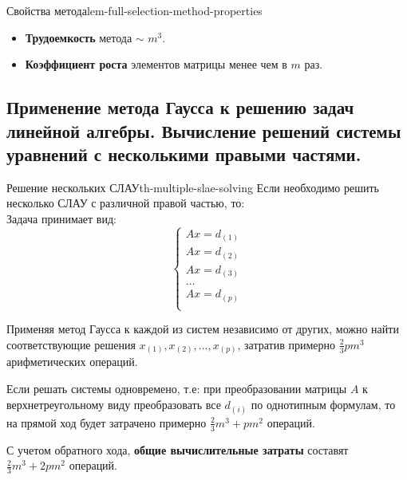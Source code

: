 \documentclass[14pt]{extarticle}
\begin{document}
        \begin{lemma}{Свойства метода}{lem-full-selection-method-properties}
            \begin{itemize}
                \item \textbf{Трудоемкость} метода $\sim$ $m^{3}$.
                \item \textbf{Коэффициент роста} элементов матрицы менее чем в $m$ раз.
            \end{itemize}
        \end{lemma}

\clearpage
\subsection{Применение метода Гаусса к решению задач линейной алгебры. Вычисление решений системы уравнений с несколькими правыми частями.}

    \begin{theorem}{Решение нескольких СЛАУ}{th-multiple-slae-solving}
        Если необходимо решить несколько СЛАУ с различной правой частью, то:\\
        Задача принимает вид:
        $$
        \begin{cases} 
            Ax = d_{(1)} \\
            Ax = d_{(2)} \\
            Ax = d_{(3)} \\
            \ldots \\
            Ax = d_{(p)} \\
        \end{cases}
        $$

        Применяя метод Гаусса к каждой из систем независимо от других, можно найти соответствующие решения $x_{(1)}, x_{(2)}, \ldots, x_{(p)}$, затратив примерно $\frac{2}{3}pm^{3}$ арифметических операций.
        
        \vspace{\baselineskip}
        
        Если решать системы одновремено, т.е: при преобразовании матрицы $A$ к верхнетреугольному виду преобразовать все $d_{(i)}$ по однотипным формулам, то на прямой ход будет затрачено примерно $\frac{2}{3}m^{3} + pm^{2}$ операций.

        \vspace{\baselineskip}

        С учетом обратного хода, \textbf{общие вычислительные затраты} составят $\frac{2}{3}m^{3} + 2pm^{2}$ операций.
    \end{theorem}
\end{document}
